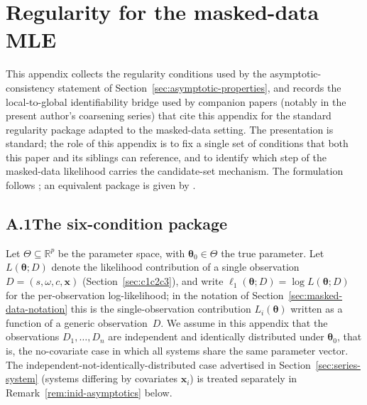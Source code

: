 \documentclass[11pt]{article}
\theoremstyle{definition}
\theoremstyle{plain}
\renewcommand{\v}[1]{\boldsymbol{#1}}
\newcommand{\btheta}{\v{\theta}}
\begin{document}
\appendix

\section{Regularity for the masked-data MLE}
\label{app:regularity}

This appendix collects the regularity conditions used by the
asymptotic-consistency statement of
Section~\ref{sec:asymptotic-properties}, and records the
local-to-global identifiability bridge used by companion papers
(notably \citealp{towell2026dpcoarsening,towell2026weaksupcoarsening}
in the present author's coarsening series) that cite this appendix
for the standard regularity package adapted to the masked-data
setting. The presentation is standard; the role of this appendix is
to fix a single set of conditions that both this paper and its
siblings can reference, and to identify which step of the
masked-data likelihood carries the candidate-set mechanism. The
formulation follows \citet{vandervaart1998asymptotic}; an equivalent
package is given by \citet[Ch.~6]{lehmann1998theory}.

\subsection*{A.1\quad The six-condition package}

Let $\Theta \subseteq \mathbb{R}^p$ be the parameter space, with
$\v{\theta}_0 \in \Theta$ the true parameter. Let
$L(\v{\theta}; D)$ denote the likelihood contribution of a single
observation $D = (s, \omega, c, \v{x})$ (Section~\ref{sec:c1c2c3}),
and write $\ell_1(\v{\theta}; D) = \log L(\v{\theta}; D)$ for the
per-observation log-likelihood; in the notation of
Section~\ref{sec:masked-data-notation} this is the single-observation
contribution $L_i(\btheta)$ written as a function of a generic
observation~$D$. We assume in this appendix that the observations
$D_1, \ldots, D_n$ are independent and identically distributed under
$\v{\theta}_0$, that is, the no-covariate case in which all systems
share the same parameter vector.
The independent-not-identically-distributed case advertised in
Section~\ref{sec:series-system} (systems differing by covariates
$\v{x}_i$) is treated separately in
Remark~\ref{rem:inid-asymptotics} below.
\end{document}
